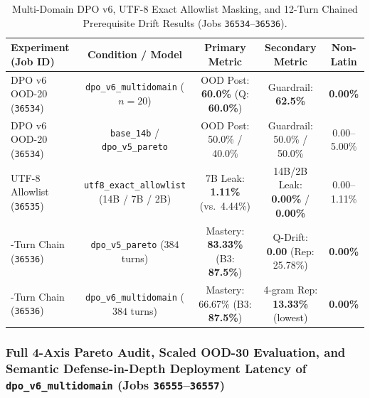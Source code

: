 \documentclass[a4paper,12pt]{report}
\begin{document}
\begin{table}[htbp]
\centering
\small
\caption{Multi-Domain DPO v6, UTF-8 Exact Allowlist Masking, and 12-Turn Chained Prerequisite Drift Results (Jobs \texttt{36534}--\texttt{36536}).}
\label{tab:exp37_39_summary}
\scriptsize\setlength{\tabcolsep}{2.5pt}
\begin{tabularx}{\textwidth}{>{\RaggedRight\arraybackslash}Xcccc}
\toprule
\textbf{Experiment (Job ID)} & \textbf{Condition / Model} & \textbf{Primary Metric} & \textbf{Secondary Metric} & \textbf{Non-Latin} \\
\midrule
DPO v6 OOD-20 (\texttt{36534}) & \texttt{dpo\_v6\_multidomain} ($n=20$) & OOD Post: \textbf{60.0\%} (Q: \textbf{60.0\%}) & Guardrail: \textbf{62.5\%} & \textbf{0.00\%} \\
DPO v6 OOD-20 (\texttt{36534}) & \texttt{base\_14b} / \texttt{dpo\_v5\_pareto} & OOD Post: 50.0\% / 40.0\% & Guardrail: 50.0\% / 50.0\% & 0.00--5.00\% \\
UTF-8 Allowlist (\texttt{36535}) & \texttt{utf8\_exact\_allowlist} (14B / 7B / 2B) & 7B Leak: \textbf{1.11\%} (vs.\ 4.44\%) & 14B/2B Leak: \textbf{0.00\%} / \textbf{0.00\%} & 0.00--1.11\% \\
12-Turn Chain (\texttt{36536}) & \texttt{dpo\_v5\_pareto} ($384$ turns) & Mastery: \textbf{83.33\%} (B3: \textbf{87.5\%}) & Q-Drift: \textbf{0.00} (Rep: 25.78\%) & \textbf{0.00\%} \\
12-Turn Chain (\texttt{36536}) & \texttt{dpo\_v6\_multidomain} ($384$ turns) & Mastery: 66.67\% (B3: \textbf{87.5\%}) & 4-gram Rep: \textbf{13.33\%} (lowest) & \textbf{0.00\%} \\
\bottomrule
\end{tabularx}
\end{table}

\subsubsection{Full 4-Axis Pareto Audit, Scaled OOD-30 Evaluation, and Semantic Defense-in-Depth Deployment Latency of \texttt{dpo\_v6\_multidomain} (Jobs \texttt{36555}--\texttt{36557})}
\label{sec:exp40_42_suite}
\end{document}
